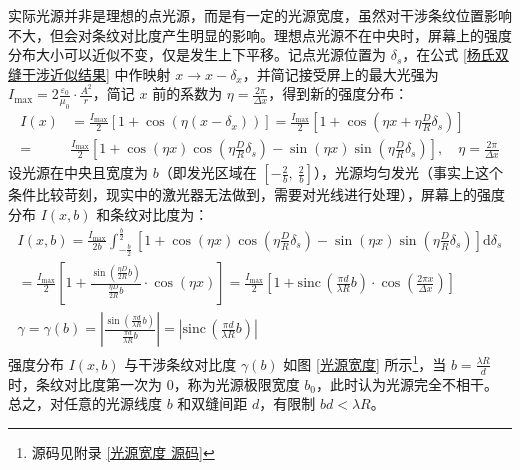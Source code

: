 \documentclass[UTF8]{report}
\def\sinc{\mathrm{sinc}\,}
\theoremstyle{MyLineTheoremStyle} %
\theoremstyle{MyBlockTheoremStyle} %
\theoremstyle{MySubsubsectionStyle} %
\begin{document}
实际光源并非是理想的点光源，而是有一定的光源宽度，虽然对干涉条纹位置影响不大，但会对条纹对比度产生明显的影响。理想点光源不在中央时，屏幕上的强度分布大小可以近似不变，仅是发生上下平移。记点光源位置为 $\delta_s$，在公式 \ref{杨氏双缝干涉近似结果} 中作映射 $x \longrightarrow x - \delta_x$，并简记接受屏上的最大光强为 $I_{\text{max}} = 2 \frac{\varepsilon_0}{\mu_0} \cdot \frac{A^2}{r}$，简记 $x$ 前的系数为 $\eta = \frac{2 \pi}{\Delta x}$，得到新的强度分布：
\begin{align}
I(x) &= \frac{I_{\text{max}}}{2}\left[
1 + \cos \left( \eta (x - \delta_x)\right)
\right] = \frac{I_{\text{max}}}{2}\left[
    1 + \cos \left( \eta x + \eta\frac{D}{R}\delta_s\right)
    \right]
\\
= &
\frac{I_{\text{max}}}{2}\left[
1 + \cos \left( \eta x \right)\cos \left(\eta\frac{D}{R}\delta_s \right) - \sin \left( \eta x \right)\sin \left( \eta\frac{D}{R}\delta_s \right)
\right],\quad \eta = \frac{2 \pi}{\Delta x}
\end{align}
设光源在中央且宽度为 $b$（即发光区域在 $[-\frac{2}{b},\ \frac{2}{b}]$），光源均匀发光（事实上这个条件比较苛刻，现实中的激光器无法做到，需要对光线进行处理），屏幕上的强度分布 $I(x, b)$ 和条纹对比度为：
\begin{gather}
I(x, b) = \frac{I_{\text{max}}}{2b} \int_{-\frac{b}{2}}^{\frac{b}{2}} \left[ 1 + \cos \left( \eta x \right)\cos \left( \eta\frac{D}{R}\delta_s \right) - \sin \left( \eta x \right)\sin \left( \eta\frac{D}{R}\delta_s \right) \right] \mathrm{d} \delta_s 
\\ 
= \frac{I_{\text{max}}}{2} \left[ 1 + \frac{\sin \left( \frac{\eta D}{2 R} b \right)}{\frac{\eta D}{2 R} b}\cdot \cos \left( \eta x \right) \right] 
= \frac{I_{\text{max}}}{2} \left[ 1 + \sinc \left(\frac{\pi d}{\lambda R} b\right) \cdot \cos \left( \frac{2 \pi x}{\Delta x}  \right) \right] 
\\ 
\gamma = \gamma(b) 
= \left| \frac{\sin \left( \frac{\pi d}{\lambda R} b \right)}{\frac{\pi d}{\lambda R} b} \right|
= \left| \sinc \left(\frac{\pi d}{\lambda R} b\right) \right|
\end{gather}
强度分布 $I(x, b)$ 与干涉条纹对比度 $\gamma(b)$ 如图 \ref{光源宽度} 所示\footnote{源码见附录 \ref{光源宽度 源码}}，当 $b = \frac{\lambda R}{d}$ 时，条纹对比度第一次为 0，称为光源极限宽度 $b_0$，此时认为光源完全不相干。总之，对任意的光源线度 $b$ 和双缝间距 $d$，有限制 $bd <  \lambda R$。
\end{document}
